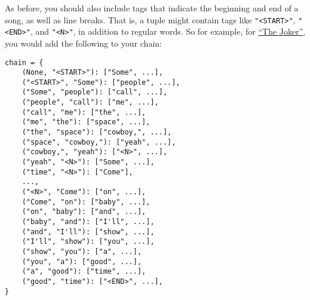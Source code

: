 \documentclass[11pt]{article}
\begin{document}
As before, you should also include tags that indicate the beginning and
end of a song, as well as line breaks. That is, a tuple might contain
tags like \texttt{"\textless{}START\textgreater{}"},
\texttt{"\textless{}END\textgreater{}"}, and
\texttt{"\textless{}N\textgreater{}"}, in addition to regular words. So
for example, for
\href{https://www.azlyrics.com/lyrics/stevemillerband/thejoker.html}{``The
Joker''}, you would add the following to your chain:

\begin{verbatim}
chain = {
    (None, "<START>"): ["Some", ...],
    ("<START>", "Some"): ["people", ...],
    ("Some", "people"): ["call", ...],
    ("people", "call"): ["me", ...],
    ("call", "me"): ["the", ...],
    ("me", "the"): ["space", ...],
    ("the", "space"): ["cowboy,", ...],
    ("space", "cowboy,"): ["yeah", ...],
    ("cowboy,", "yeah"): ["<N>", ...],
    ("yeah", "<N>"): ["Some", ...],
    ("time", "<N>"): ["Come"],
    ...,
    ("<N>", "Come"): ["on", ...],
    ("Come", "on"): ["baby", ...],
    ("on", "baby"): ["and", ...],
    ("baby", "and"): ["I'll", ...],
    ("and", "I'll"): ["show", ...],
    ("I'll", "show"): ["you", ...],
    ("show", "you"): ["a", ...],
    ("you", "a"): ["good", ...],
    ("a", "good"): ["time", ...],
    ("good", "time"): ["<END>", ...],
}
\end{verbatim}
\end{document}
